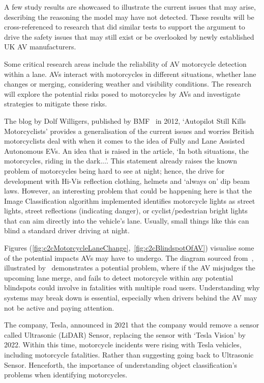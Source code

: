 \documentclass[12pt]{report} %
\begin{document}
	A few study results are showcased to illustrate the current issues that may arise, describing the reasoning the model may have not detected. These results will be cross-referenced to research that did similar tests to support the argument to drive the safety issues that may still exist or be overlooked by newly established UK AV manufacturers.

	Some critical research areas include the reliability of AV motorcycle detection within a lane. AVs interact with motorcycles in different situations, whether lane changes or merging, considering weather and visibility conditions. The research will explore the potential risks posed to motorcycles by AVs and investigate strategies to mitigate these risks.

	The blog by Dolf Willigers, published by BMF~\cite{dolf_willigers_autopilot_2022} in 2012, `Autopilot Still Kills Motorcyclists' provides a generalisation of the current issues and worries British motorcyclists deal with when it comes to the idea of Fully and Lane Assisted Autonomous EVs. An idea that is raised in the article, `In both situations, the motorcycles, riding in the dark...'. This statement already raises the known problem of motorcycles being hard to see at night; hence, the drive for development with Hi-Vis reflection clothing, helmets and `always on' dip beam laws. However, an interesting problem that could be happening here is that the Image Classification algorithm implemented identifies motorcycle lights as street lights, street reflections (indicating danger), or cyclist/pedestrian bright lights that can aim directly into the vehicle's lane. Usually, small things like this can blind a standard driver driving at night. 

	Figures (\ref{fig:c2cMotorcycleLaneChange},~\ref{fig:c2cBlindspotOfAV}) visualise some of the potential impacts AVs may have to undergo. The diagram sourced from~\cite{aecm__the_motorcycle_industry_in_europe_looking_nodate}, illustrated by~\cite{connected_motorcycle_consortium_applications_nodate} demonstrates a potential problem, where if the AV misjudges the upcoming lane merge, and fails to detect motorcycle within any potential blindspots could involve in fatalities with multiple road users. Understanding why systems may break down is essential, especially when drivers behind the AV may not be active and paying attention.

	The company, Tesla, announced in 2021 that the company would remove a sensor called Ultrasonic (LiDAR) Sensor, replacing the sensor with `Tesla Vision' by 2022. Within this time, motorcycle incidents were rising with Tesla vehicles, including motorcycle fatalities. Rather than suggesting going back to Ultrasonic Sensor. Henceforth, the importance of understanding object classification's problems when identifying motorcycles.
\end{document}
